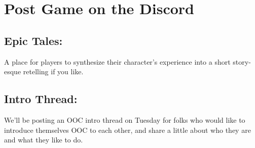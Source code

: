 \documentclass[green]{GL2020}
\begin{document}
\section*{Post Game on the Discord}

\subsection*{Epic Tales:}
A place for players to synthesize their character’s experience into a short story-esque retelling if you like.

\subsection*{Intro Thread:}
We’ll be posting an OOC intro thread on Tuesday for folks who would like to introduce themselves OOC to each other, and share a little about who they are and what they like to do.
\end{document}
